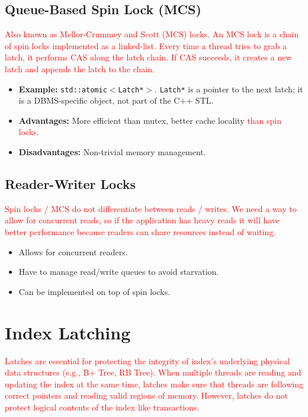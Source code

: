 \documentclass[11pt]{article}
\newcommand{\rr}[1]{\textcolor{red}{#1}}
\begin{document}
\subsection*{Queue-Based Spin Lock (MCS)}
\rr{Also known as Mellor-Crummey and Scott (MCS) locks. An MCS lock is a chain of spin locks implemented as a linked-list. Every time a thread tries to grab a latch, it performs CAS along the latch chain. If CAS succeeds, it creates a new latch and appends the latch to the chain.}

\begin{itemize}
    \item 
    \textbf{Example:} \texttt{std::atomic$<$Latch*$>$}. \texttt{Latch*} is a pointer to the next latch; it is a DBMS-specific object, not part of the C++ STL.
    \item
    \textbf{Advantages:} More efficient than mutex, better cache locality \rr{than spin locks}.
    
    \item
    \textbf{Disadvantages:}  Non-trivial memory management.
\end{itemize}

\subsection*{Reader-Writer Locks}
\rr{Spin locks / MCS do not differentiate between reads / writes. We need a way to allow for concurrent reads, so if the application has heavy reads it will have better performance because readers can share resources instead of waiting.}
\begin{itemize}
    \item
    Allows for concurrent readers.
    
    \item
    Have to manage read/write queues to avoid starvation.
    
    \item
    Can be implemented on top of spin locks.
\end{itemize}

\section{Index Latching}
\rr{Latches are essential for protecting the integrity of index's underlying physical data structures (e.g., B+ Tree, RB Tree). When multiple threads are reading and updating the index at the same time, latches make sure that threads are following correct pointers and reading valid regions of memory. However, latches do not protect logical contents of the index like transactions.}
\end{document}
